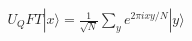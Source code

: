\documentclass[preview]{standalone}
\begin{document}
\begin{align*}
U_QFT |x\rangle = \frac{1}{\sqrt{N}} \sum_{y} e^{2πixy/N} |y\rangle
\end{align*}
\end{document}
